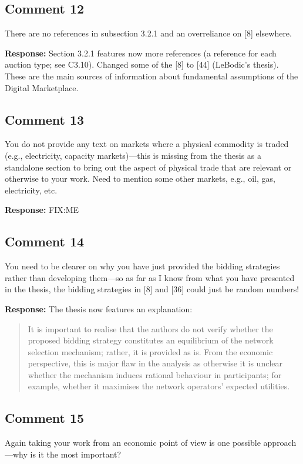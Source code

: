 \documentclass[10pt,a4paper,notitlepage]{article}
\numberwithin{equation}{section}
\begin{document}
\subsection{Comment 12}
There are no references in subsection 3.2.1 and an overreliance on [8] elsewhere.

\textbf{Response:}
Section 3.2.1 features now more references (a reference for each auction type; see C3.10). Changed some of the [8] to [44] (LeBodic's thesis). These are the main sources of information about fundamental assumptions of the Digital Marketplace.

\subsection{Comment 13}
You do not provide any text on markets where a physical commodity is traded (e.g., electricity, capacity markets)---this is missing from the thesis as a standalone section to bring out the aspect of physical trade that are relevant or otherwise to your work. Need to mention some other markets, e.g., oil, gas, electricity, etc.

\textbf{Response:}
FIX:ME

\subsection{Comment 14}
You need to be clearer on why you have just provided the bidding strategies rather than developing them---so as far as I know from what you have presented in the thesis, the bidding strategies in [8] and [36] could just be random numbers!

\textbf{Response:}
The thesis now features an explanation:
\begin{quote}
It is important to realise that the authors do not verify whether the proposed bidding strategy constitutes an equilibrium of the network selection mechanism; rather, it is provided as is. From the economic perspective, this is major flaw in the analysis as otherwise it is unclear whether the mechanism induces rational behaviour in participants; for example, whether it maximises the network operators' expected utilities.
\end{quote}

\subsection{Comment 15}
Again taking your work from an economic point of view is one possible approach---why is it the most important?
\end{document}
